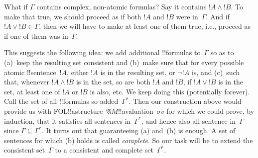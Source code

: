 \documentclass[10pt,a4paper]{article}
\theoremstyle{plain}
\theoremstyle{definition}
\theoremstyle{remark}
\providecommand{\Struct}{\ensuremath{\mathfrak{A}}}
\providecommand{\iftag}[1]{#1}
\providecommand{\pAssign}{\sigma}
\begin{document}
What if $\Gamma$ contains complex, non-atomic formulas? Say it
contains $!A \land !B$. To make that true, we should proceed as if
both $!A$ and $!B$ were in~$\Gamma$.  And if $!A \lor !B \in \Gamma$,
then we will have to make at least one of them true, i.e., proceed as
if one of them was in~$\Gamma$.

This suggests the following idea: we add additional !!{formula}s
to~$\Gamma$ so as to (a)~keep the resulting set consistent and
(b)~make sure that for every possible atomic !!{sentence}~$!A$, either
$!A$ is in the resulting set, or $\lnot !A$ is, and (c)~such that,
whenever $!A \land !B$ is in the set, so are both $!A$ and $!B$, if
$!A \lor !B$ is in the set, at least one of $!A$ or $!B$ is also, etc.
We keep doing this (potentially forever).  Call the set of all
!!{formula}s so added~$\Gamma^*$.  Then our construction above would
provide us with \iftag{FOL}{!!a{structure}~$\Struct{M}$}{!!a{valuation}~$\pAssign{v}$}
for which we could prove, by induction, that it satisfies all sentences
in~$\Gamma^*$, and hence also all sentence in~$\Gamma$
since $\Gamma \subseteq \Gamma^*$.  It turns out that guaranteeing (a)
and~(b) is enough. A set of sentences for which (b) holds is called
\emph{complete}. So our task will be to extend the consistent
set~$\Gamma$ to a consistent and complete set~$\Gamma^*$.
\end{document}

